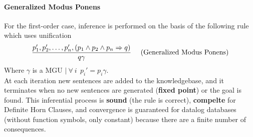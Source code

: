 \documentclass[10pt]{report}
\begin{document}
\paragraph{Generalized Modus Ponens} For the first-order case, inference is performed on the basis of the following rule which uses unification $$\frac{p_1',p_2',\ldots,p_n',(p_1\wedge p_2\wedge p_n\Rightarrow q)}{q\gamma}\:\:\:\:\:\:\hbox{(Generalized Modus Ponens)}$$
Where $\gamma$ is a MGU $|\:\forall\:i\:\:p_i' = p_i\gamma$.\\
At each iteration new sentences are added to the knowledgebase, and it terminates when no new sentences are generated (\textbf{fixed point}) or the goal is found. This inferential process is \textbf{sound} (the rule is correct), \textbf{compelte} for Definite Horn Clauses, and convergence is guaranteed for datalog databases (without function symbols, only constant) because there are a finite number of consequences.
\end{document}
